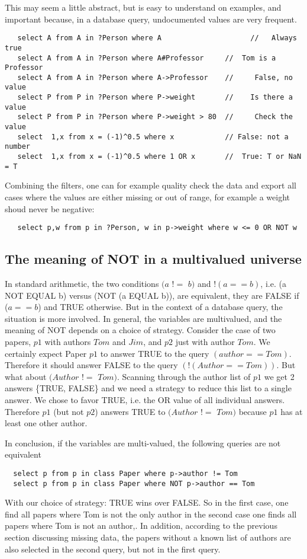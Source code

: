 \documentclass[11pt]{article}
\newcommand{\BL}{\begin{lstlisting}}
\begin{document}
This may seem a little abstract, but is easy to understand on examples, and important
because, in a database query, undocumented values are very frequent.

\BL
   select A from A in ?Person where A                     //   Always true
   select A from A in ?Person where A#Professor     //  Tom is a Professor
   select A from A in ?Person where A->Professor    //     False, no value
   select P from P in ?Person where P->weight       //    Is there a value
   select P from P in ?Person where P->weight > 80  //     Check the value
   select  1,x from x = (-1)^0.5 where x            // False: not a number
   select  1,x from x = (-1)^0.5 where 1 OR x       //  True: T or NaN = T
\end{lstlisting}

Combining the filters, one can for example quality check the data and export all cases
where the values are either missing or out of range, for example a weight shoud never
be negative:
\BL
   select p,w from p in ?Person, w in p->weight where w <= 0 OR NOT w 
\end{lstlisting}

\subsection{The meaning of NOT in a multivalued universe}

In standard arithmetic, the two conditions $(a$ $!$$=$ $b)$ and $! (a == b)$, 
i.e. (a NOT EQUAL b) versus (NOT (a EQUAL b)),
are equivalent, they are FALSE if ($a == b$) and TRUE otherwise. But in
the context of a database query, the situation is more involved.
In general, the variables are multivalued, and the meaning of NOT depends
on a choice of strategy. Consider the case of two
papers, $p1$ with authors $Tom$ and $Jim$, and $p2$ just with author $Tom$.
We certainly expect Paper $p1$ to answer TRUE to the query $(author == Tom)$.
Therefore it should answer FALSE to the query $(! (Author == Tom))$.
But what about $(Author$ $!$$=$ $Tom)$. Scanning through the author list of $p1$
we get 2 answers \{TRUE, FALSE\} and we need a strategy to reduce this list 
to a single answer. We chose to favor TRUE, i.e. the OR value of
all individual answers. Therefore $p1$ (but not $p2$) answers TRUE to 
$(Author$ $!$$=$ $Tom)$
because $p1$ has at least one other author.

In conclusion, if the variables are multi-valued, the following queries are
not equivalent
\BL
  select p from p in class Paper where p->author != Tom
  select p from p in class Paper where NOT p->author == Tom
\end{lstlisting}
With our choice of strategy: TRUE wins over FALSE.
So in the first case, one find all papers where Tom is not the only author
in the second case one finds all papers where Tom is not an author,.
In addition, according to the previous section discussing missing data,
the papers without a known list of authors
are also selected in the second query, but not in the first query.
\end{document}
